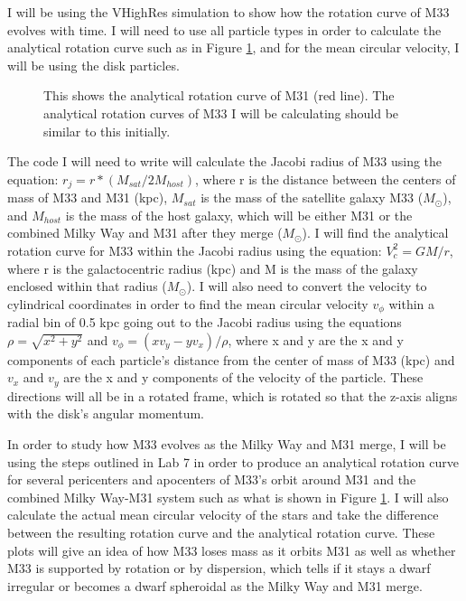 \documentclass[trackchanges, twocolumn]{aastex7}
\begin{document}
I will be using the VHighRes simulation to show how the rotation curve of M33 evolves with time. I will need to use all particle types in order to calculate the analytical rotation curve such as in Figure \ref{fig:Lab7}, and for the mean circular velocity, I will be using the disk particles.

\begin{figure}[ht!]
\caption{ This shows the analytical rotation curve of M31 (red line). The analytical rotation curves of M33 I will be calculating should be similar to this initially.
\label{fig:Lab7}}
\end{figure}

The code I will need to write will calculate the Jacobi radius of M33 using the equation: 
\(r_j = r*(M_{sat}/2M_{host})\),
where r is the distance between the centers of mass of M33 and M31 (kpc), \(M_{sat}\) is the mass of the satellite galaxy M33 (\(M_\odot\)), and \(M_{host}\) is the mass of the host galaxy, which will be either M31 or the combined Milky Way and M31 after they merge (\(M_\odot\)). I will find the analytical rotation curve for M33 within the Jacobi radius using the equation:
\(V_c^2=GM/r\),
where r is the galactocentric radius (kpc) and M is the mass of the galaxy enclosed within that radius (\(M_\odot\)). I will also need to convert the velocity to cylindrical coordinates in order to find the mean circular velocity \(v_\phi\) within a radial bin of 0.5 kpc going out to the Jacobi radius using the equations \(\rho=\sqrt{x^2+y^2}\) and \(v_\phi=(xv_y-yv_x)/\rho\), where x and y are the x and y components of each particle's distance from the center of mass of M33 (kpc) and \(v_x\) and \(v_y\) are the x and y components of the velocity of the particle. These directions will all be in a rotated frame, which is rotated so that the z-axis aligns with the disk's angular momentum.

In order to study how M33 evolves as the Milky Way and M31 merge, I will be using the steps outlined in Lab 7 in order to produce an analytical rotation curve for several pericenters and apocenters of M33's orbit around M31 and the combined Milky Way-M31 system such as what is shown in Figure \ref{fig:Lab7}. I will also calculate the actual mean circular velocity of the stars and take the difference between the resulting rotation curve and the analytical rotation curve. These plots will give an idea of how M33 loses mass as it orbits M31 as well as whether M33 is supported by rotation or by dispersion, which tells if it stays a dwarf irregular or becomes a dwarf spheroidal as the Milky Way and M31 merge.
\end{document}
